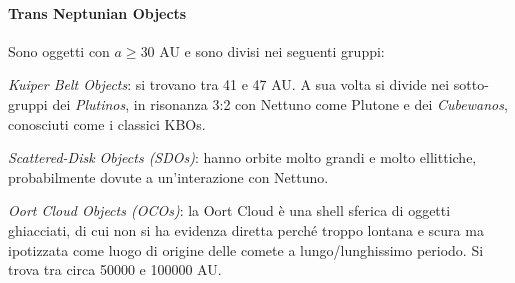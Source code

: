 \documentclass[a4paper,11pt,openright]{book}
\begin{document}
\paragraph*{Trans Neptunian Objects}
Sono oggetti con $a\geq 30$ AU e sono divisi nei seguenti gruppi:

\textit{Kuiper Belt Objects}: si trovano tra 41 e 47 AU. A sua volta si divide nei sotto-gruppi dei \textit{Plutinos}, in risonanza 3:2 con Nettuno come Plutone e dei \textit{Cubewanos}, conosciuti come i classici KBOs.

\textit{Scattered-Disk Objects (SDOs)}: hanno orbite molto grandi e molto ellittiche, probabilmente dovute a un’interazione con Nettuno.

\textit{Oort Cloud Objects (OCOs)}: la Oort Cloud è una shell sferica di oggetti ghiacciati, di cui non si ha evidenza diretta perché troppo lontana e scura ma ipotizzata come luogo di origine delle comete a lungo/lunghissimo periodo. Si trova tra circa 50000 e 100000 AU.
\end{document}
